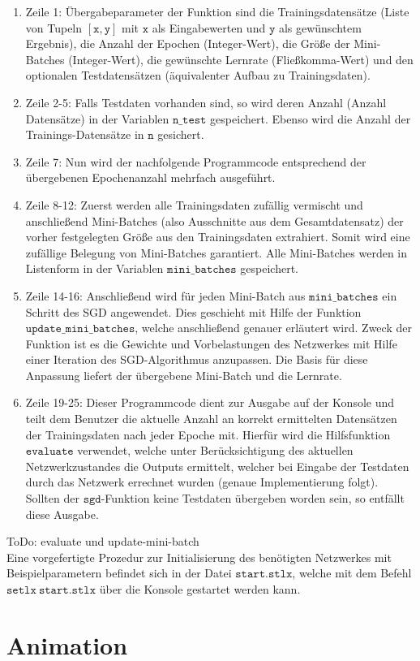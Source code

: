\begin{enumerate}
\item Zeile 1: Übergabeparameter der Funktion sind die Trainingsdatensätze (Liste von Tupeln $\mathtt{[x,y]}$ mit $\mathtt{x}$ als Eingabewerten und $\mathtt{y}$ als gewünschtem Ergebnis), die Anzahl der Epochen (Integer-Wert), die Größe der Mini-Batches (Integer-Wert), die gewünschte Lernrate (Fließkomma-Wert) und den optionalen Testdatensätzen (äquivalenter Aufbau zu Trainingsdaten).
\item Zeile 2-5: Falls Testdaten vorhanden sind, so wird deren Anzahl (Anzahl Datensätze) in der Variablen $\mathtt{n\_test}$ gespeichert. Ebenso wird die Anzahl der Trainings-Datensätze in $\mathtt{n}$ gesichert.
\item Zeile 7: Nun wird der nachfolgende Programmcode entsprechend der übergebenen Epochenanzahl mehrfach ausgeführt.
\item Zeile 8-12: Zuerst werden alle Trainingsdaten zufällig vermischt und anschließend Mini-Batches (also Ausschnitte aus dem Gesamtdatensatz) der vorher festgelegten Größe aus den Trainingsdaten extrahiert. Somit wird eine zufällige Belegung von Mini-Batches garantiert. Alle Mini-Batches werden in Listenform in der Variablen $\mathtt{mini\_batches}$ gespeichert.
\item Zeile 14-16: Anschließend wird für jeden Mini-Batch aus $\mathtt{mini\_batches}$ ein Schritt des SGD angewendet. Dies geschieht mit Hilfe der Funktion $\mathtt{update\_mini\_batches}$, welche anschließend genauer erläutert wird. Zweck der Funktion ist es die Gewichte und Vorbelastungen des Netzwerkes mit Hilfe einer Iteration des SGD-Algorithmus anzupassen. Die Basis für diese Anpassung liefert der übergebene Mini-Batch und die Lernrate.
\item Zeile 19-25: Dieser Programmcode dient zur Ausgabe auf der Konsole und teilt dem Benutzer die aktuelle Anzahl an korrekt ermittelten Datensätzen der Trainingsdaten nach jeder Epoche mit. Hierfür wird die Hilfsfunktion $\mathtt{evaluate}$ verwendet, welche unter Berücksichtigung des aktuellen Netzwerkzustandes die Outputs ermittelt, welcher bei Eingabe der Testdaten durch das Netzwerk errechnet wurden (genaue Implementierung folgt). Sollten der $\mathtt{sgd}$-Funktion keine Testdaten übergeben worden sein, so entfällt diese Ausgabe.
\end{enumerate}

\noindent
ToDo: evaluate und update-mini-batch \\

\noindent
Eine vorgefertigte Prozedur zur Initialisierung des benötigten Netzwerkes mit Beispielparametern befindet sich in der Datei $\mathtt{start.stlx}$, welche mit dem Befehl $\mathtt{setlx\ start.stlx}$ über die Konsole gestartet werden kann.

\section{Animation}